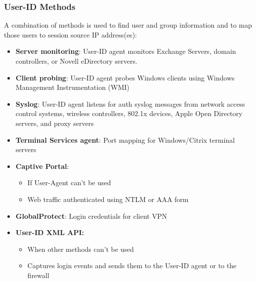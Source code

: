 \subsubsection{User-ID Methods}
A combination of methods is used to find user and group information and to map those users to session source IP address(es):
\begin{itemize}
    \item \textbf{Server monitoring}: User-ID agent monitors Exchange Servers, domain controllers, or Novell eDirectory servers.
    \item \textbf{Client probing}: User-ID agent probes Windows clients using Windows Management Instrumentation (WMI)
    \item \textbf{Syslog}: User-ID agent listens for auth syslog messages from network access control systems, wireless controllers, 802.1x devices, Apple Open Directory servers, and proxy servers
    \item \textbf{Terminal Services agent}: Port mapping for Windows/Citrix terminal servers
    \item \textbf{Captive Portal}:
        \begin{itemize}
            \item If User-Agent can't be used
            \item Web traffic authenticated using NTLM or AAA form
        \end{itemize}
    \item \textbf{GlobalProtect}: Login credentials for client VPN
    \item \textbf{User-ID XML API:}
        \begin{itemize}
            \item When other methods can't be used
            \item Captures login events and sends them to the User-ID agent or to the firewall
        \end{itemize}
\end{itemize}

